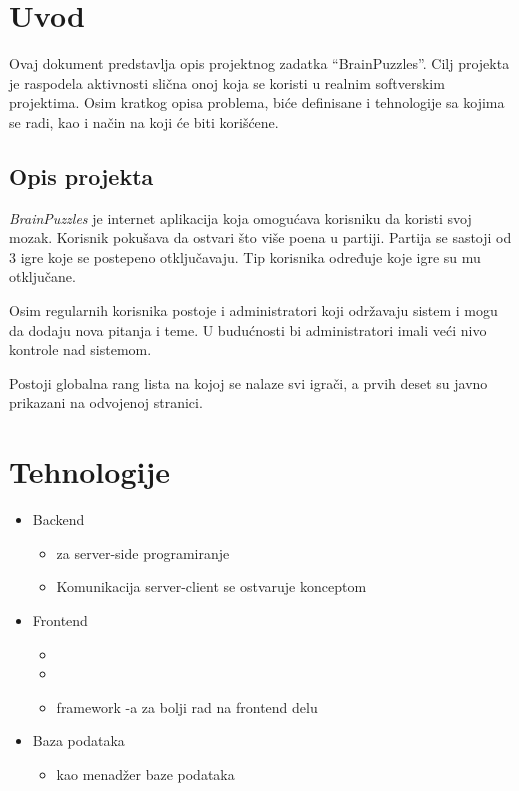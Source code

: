 \documentclass{article}
\begin{document}
\newpage
\section{Uvod}
Ovaj dokument predstavlja opis projektnog zadatka “BrainPuzzles”. Cilj projekta je raspodela 
aktivnosti slična onoj koja se koristi u realnim softverskim projektima. Osim kratkog opisa problema, biće 
definisane i tehnologije sa kojima se radi, kao i način na koji će biti korišćene.
\subsection{Opis projekta}
\par \textit{BrainPuzzles} je internet aplikacija koja omogućava korisniku da koristi svoj mozak. 
Korisnik pokušava da ostvari što više poena u partiji. Partija se sastoji od 3 igre koje se 
postepeno otključavaju. Tip korisnika određuje koje igre su mu otključane. 
\par Osim regularnih korisnika postoje i administratori koji održavaju sistem i mogu da 
dodaju nova pitanja i teme. U budućnosti bi administratori imali veći nivo kontrole nad 
sistemom. 
\par Postoji globalna rang lista na kojoj se nalaze svi igrači, a prvih deset su javno prikazani na 
odvojenoj stranici.
\newpage
\section{Tehnologije}
\begin{itemize}
    \item Backend
    \begin{itemize}
        \item {} za server-side programiranje
        \item Komunikacija server-client se ostvaruje  konceptom
    \end{itemize}
    \item Frontend
    \begin{itemize}
        \item {}
        \item {}
        \item {} framework -a za bolji rad na frontend delu
    \end{itemize}
    \item Baza podataka
    \begin{itemize}
        \item {} kao menadžer baze podataka
    \end{itemize}
\end{itemize}
\newpage
\end{document}
